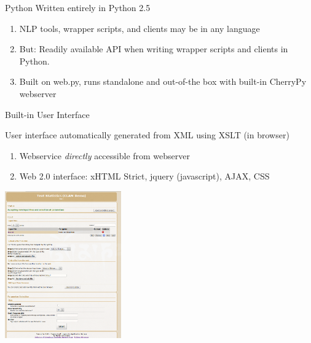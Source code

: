 \documentclass[compress]{beamer}
\begin{document}
\begin{frame}
    \begin{block}{Python}
            Written entirely in Python 2.5

            \begin{enumerate}
                \item NLP tools, wrapper scripts, and clients may be in any language 
                \item But: Readily available API  when writing wrapper scripts and clients in Python.
                \item Built on web.py, runs standalone and out-of-the box with built-in CherryPy webserver        
            \end{enumerate}

    \end{block}
\end{frame}


\begin{frame}
    \begin{block}{Built-in User Interface}

            User interface automatically generated from XML using XSLT (in browser)

            \begin{enumerate}
                \item Webservice \emph{directly} accessible from webserver
                \item Web 2.0 interface: xHTML Strict, jquery (javascript), AJAX, CSS
            \end{enumerate}
            

    \end{block}
    
    \begin{center}
    \includegraphics[width=50.0mm]{screenshot.png}
    \end{center}

\end{frame}
\end{document}

